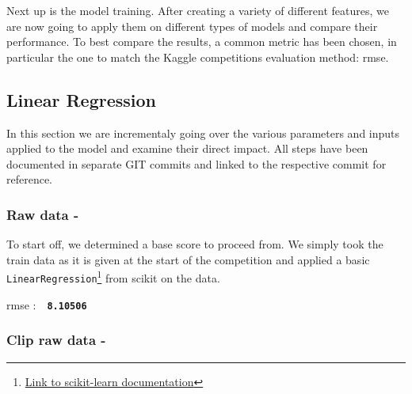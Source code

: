 \newcommand{\rmse}[1]{
	\vspace*{-2mm}
	\begin{center}
		\begin{tcolorbox}[colback=white, colframe=cyan, halign=flush center]
				\Acrshort{rmse} :\ \ \textbf{\texttt{#1}}
		\end{tcolorbox}
	\end{center}
}


Next up is the model training. After creating a variety of different features, we are now going to apply them on different types of models and compare their performance. To best compare the results, a common metric has been chosen, in particular the one to match the Kaggle competitions evaluation method: \acrfull{rmse}.

\subsection{Linear Regression}

In this section we are incrementaly going over the various parameters and inputs applied to the model and examine their direct impact. All steps have been documented in separate GIT commits and linked to the respective commit for reference.

\subsubsection{Raw data - }

To start off, we determined a base score to proceed from. We simply took the train data as it is given at the start of the competition and applied a basic \texttt{LinearRegression}\footnote{\href{https://scikit-learn.org/stable/modules/generated/sklearn.linear_model.LinearRegression.html\#sklearn.linear_model.LinearRegression}{Link to scikit-learn documentation}} from \gls{scikit} on the data.
\rmse{8.10506}


\subsubsection{Clip raw data - }

